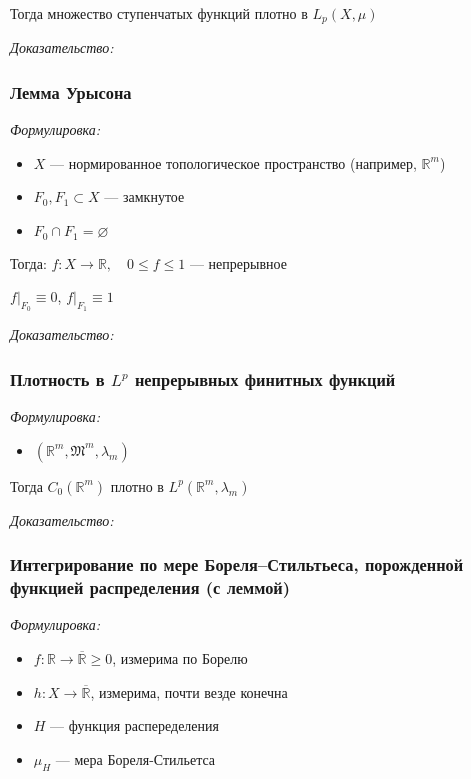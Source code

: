 \documentclass{article}
\def\rinf{\overline{\mathbb{R}}}
\begin{document}
Тогда множество ступенчатых функций плотно в $L_p(X, \mu)$

\textit{Доказательство:}

\subsubsection{Лемма Урысона}
\textit{Формулировка:}

\begin{itemize}
    \item $X$ --- нормированное топологическое пространство (например, $\mathbb{R}^m$)
    \item $F_0, F_1 \subset X$ --- замкнутое
    \item $F_0 \cap F_1 = \varnothing$
\end{itemize}

Тогда: $f: X \rightarrow \mathbb{R}, \quad 0 \le f \le 1$ --- непрерывное

$f|_{F_0} \equiv  0$, $f|_{F_1} \equiv 1$

\textit{Доказательство:}

\subsubsection{Плотность в $L^p$ непрерывных финитных функций}
\textit{Формулировка:}

\begin{itemize}
    \item $(\mathbb{R}^{m}, \mathfrak{M}^{m}, \lambda_m)$
\end{itemize}

Тогда $C_0(\mathbb{R}^{m})$ плотно в $L^{p}(\mathbb{R}^{m}, \lambda_m)$

\textit{Доказательство:}

\subsubsection{Интегрирование по мере Бореля--Стильтьеса, порожденной функцией распределения (с леммой)}
\textit{Формулировка:}

\begin{itemize}
    \item $f: \mathbb{R} \rightarrow \rinf \ge 0$, измерима по Борелю
    \item $h: X \rightarrow \rinf$, измерима, почти везде конечна
    \item $H$ --- функция распеределения
    \item $\mu_{H}$ --- мера Бореля-Стильетса
\end{itemize}
\end{document}
